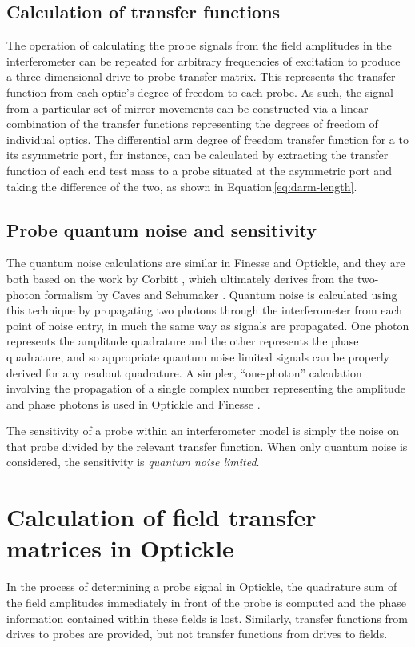 \subsection{Calculation of transfer functions}
The operation of calculating the probe signals from the field amplitudes in the interferometer can be repeated for arbitrary frequencies of excitation to produce a three-dimensional drive-to-probe transfer matrix. This represents the transfer function from each optic's degree of freedom to each probe. As such, the signal from a particular set of mirror movements can be constructed via a linear combination of the transfer functions representing the degrees of freedom of individual optics. The differential arm degree of freedom transfer function for a \MI{} to its asymmetric port, for instance, can be calculated by extracting the transfer function of each end test mass to a probe situated at the asymmetric port and taking the difference of the two, as shown in Equation\,\ref{eq:darm-length}.

\subsection{Probe quantum noise and sensitivity}
The quantum noise calculations are similar in Finesse and Optickle, and they are both based on the work by Corbitt \etal{} \cite{Corbitt2005}, which ultimately derives from the two-photon formalism by Caves and Schumaker \cite{Caves1985, Schumaker1985}. Quantum noise is calculated using this technique by propagating two photons through the interferometer from each point of noise entry, in much the same way as signals are propagated. One photon represents the amplitude quadrature and the other represents the phase quadrature, and so appropriate quantum noise limited signals can be properly derived for any readout quadrature. A simpler, ``one-photon'' calculation involving the propagation of a single complex number representing the amplitude and phase photons is used in Optickle and Finesse \cite{Evans2013, Brown2016}.

The sensitivity of a probe within an interferometer model is simply the noise on that probe divided by the relevant transfer function. When only quantum noise is considered, the sensitivity is \emph{quantum noise limited}.

\section{\label{sec:optickle-field-tfs}Calculation of field transfer matrices in Optickle}
In the process of determining a probe signal in Optickle, the quadrature sum of the field amplitudes immediately in front of the probe is computed and the phase information contained within these fields is lost. Similarly, transfer functions from drives to probes are provided, but not transfer functions from drives to fields.

